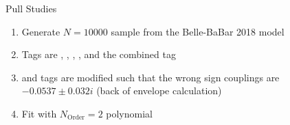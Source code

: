 \begin{frame}{Pull Studies}
\begin{enumerate}
    \item Generate $N=10000$ sample from the Belle-BaBar 2018 model
    \item Tags are \KK, \Kspiz, \Kppim, \Kmpip, \Kspipi and the combined tag
    \item \Kppim and \Kmpip tags are modified such that the wrong sign couplings are $-0.0537\pm0.032i$ (back of envelope calculation)
    \item Fit with $N_\text{Order}=2$ polynomial
\end{enumerate}{}
\end{frame}


